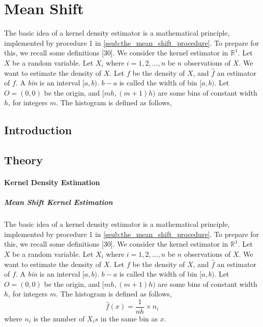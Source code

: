 \chapter{Mean Shift}\label{ch:mean_shift}
The basic idea of a kernel density estimator is a mathematical principle, 
implemented by procedure 1 in \autoref{ssub:the_mean_shift_procedure}. To prepare
for this, we recall some definitions [30]. We consider the kernel estimator in
$\mathbb{R}^1$. Let $X$ be a random variable. Let $X_i$ where $i=1,2,\ldots,n$ be
$n$ observations of $X$. We want to estimate the density  of $X$. Let $f$ be the
density of $X$, and $\hat{f}$ an estimator of $f$. A \emph{bin} is an interval
$[a,b)$. $b-a$ is called the width of bin $[a,b)$. Let $O=(0,0)$ be the origin, 
and $[mh, (m+1)h)$ are some bins of constant width $h$, for integers $m$. The
histogram is defined as follows,

\section{Introduction} %
\label{sec:introduction}

\section{Theory} %
\label{sec:theory}



\subsubsection{Kernel Density Estimation} %
\label{ssub:the_kernel_density_estimator}

\paragraph{Mean Shift Kernel Estimation} %
\label{par:mean_shift_kernel_estimation}


The basic idea of a kernel density estimator is a mathematical principle, 
implemented by procedure 1 in \autoref{ssub:the_mean_shift_procedure}. To prepare
for this, we recall some definitions [30]. We consider the kernel estimator in
$\mathbb{R}^1$. Let $X$ be a random variable. Let $X_i$ where $i=1,2,\ldots,n$ be
$n$ observations of $X$. We want to estimate the density  of $X$. Let $f$ be the
density of $X$, and $\hat{f}$ an estimator of $f$. A \emph{bin} is an interval
$[a,b)$. $b-a$ is called the width of bin $[a,b)$. Let $O=(0,0)$ be the origin, 
and $[mh, (m+1)h)$ are some bins of constant width $h$, for integers $m$. The
histogram is defined as follows,
\begin{equation}\label{eq:histogram}
	\hat{f}(x)=\frac{1}{nh} \times n_i
\end{equation}
where $n_i$ is the number of $X_i s$ in the same bin as $x$.

